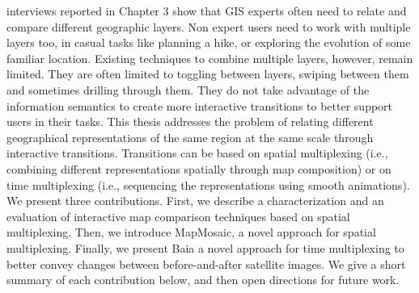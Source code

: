 interviews reported in Chapter 3 show that GIS experts often need to relate and compare
different geographic layers. Non expert users need to work with multiple layers
too, in casual tasks like planning a hike, or exploring the evolution of some familiar
location. Existing techniques to combine multiple layers, however, remain limited.
They are often limited to toggling between layers, swiping between them and sometimes
drilling through them. They do not take advantage of the information semantics
to create more interactive transitions to better support users in their tasks.
This thesis addresses the problem of relating different geographical representations
of the same region at the same scale through interactive transitions. Transitions
can be based on spatial multiplexing (i.e., combining different representations spatially
through map composition) or on time multiplexing (i.e., sequencing the representations
using smooth animations).
We present three contributions. First, we describe a characterization and an
evaluation of interactive map comparison techniques based on spatial multiplexing.
Then, we introduce MapMosaic, a novel approach for spatial multiplexing. Finally,
we present Baia a novel approach for time multiplexing to better convey changes
between before-and-after satellite images. We give a short summary of each contribution
below, and then open directions for future work.


